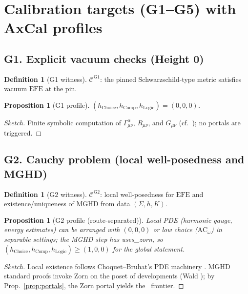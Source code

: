 \documentclass[11pt]{article}
\newtheorem{proposition}[theorem]{Proposition}
\theoremstyle{definition}
\newtheorem{definition}[theorem]{Definition}
\theoremstyle{remark}
\newcommand{\AC}{\mathrm{AC}}
\newcommand{\ACw}{\mathrm{AC}_\omega}
\newcommand{\hChoice}{h_{\mathrm{Choice}}}    %
\newcommand{\hComp}{h_{\mathrm{Comp}}}        %
\newcommand{\hLogic}{h_{\mathrm{Logic}}}      %
\newcommand{\EFE}{\mathrm{EFE}} %
\begin{document}
\section{Calibration targets (G1--G5) with AxCal profiles}
\subsection*{G1. Explicit vacuum checks (Height 0)}
\begin{definition}[G1 witness]
$\mathcal{C}^{\mathrm{G1}}$: the pinned Schwarzschild-type metric satisfies vacuum $\EFE$ at the pin.
\end{definition}
\begin{proposition}[G1 profile]\label{prop:G1}
$(\hChoice,\hComp,\hLogic)=(0,0,0)$.
\end{proposition}
\begin{proof}[Sketch]
Finite symbolic computation of $\Gamma^\alpha_{\mu\nu}$, $R_{\mu\nu}$, and $G_{\mu\nu}$ (cf.\ \cite[§B.4]{Wald1984}); no portals are triggered.
\end{proof}

\subsection*{G2. Cauchy problem (local well-posedness and MGHD)}
\begin{definition}[G2 witness]
$\mathcal{C}^{\mathrm{G2}}$: local well-posedness for $\EFE$ and existence/uniqueness of MGHD from data $(\Sigma,h,K)$.
\end{definition}
\begin{proposition}[G2 profile (route-separated)]\label{prop:G2}
Local PDE (harmonic gauge, energy estimates) can be arranged with $(0,0,0)$ or low choice ($\ACw$) in separable settings; the MGHD step has \textsf{uses\_zorn}, so $(\hChoice,\hComp,\hLogic)\ge(1,0,0)$ for the global statement.
\end{proposition}
\begin{proof}[Sketch]
Local existence follows Choquet--Bruhat's PDE machinery \cite{ChoquetBruhat2009}. MGHD standard proofs invoke Zorn on the poset of developments (Wald \cite[Thm.~10.1.2]{Wald1984}); by Prop.~\ref{prop:portals}, the Zorn portal yields the \AC\ frontier.
\end{proof}
\end{document}
